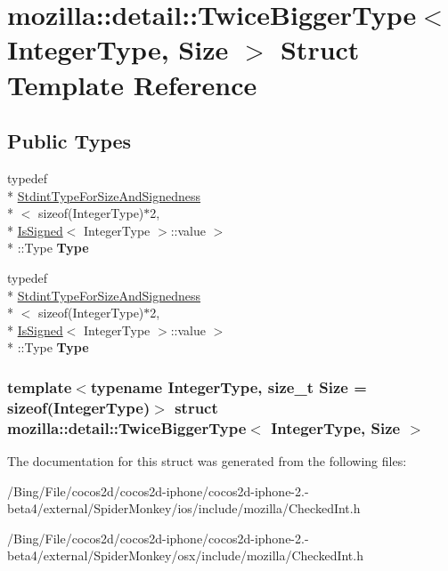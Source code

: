 \hypertarget{structmozilla_1_1detail_1_1_twice_bigger_type}{\section{mozilla\-:\-:detail\-:\-:Twice\-Bigger\-Type$<$ Integer\-Type, Size $>$ Struct Template Reference}
\label{structmozilla_1_1detail_1_1_twice_bigger_type}
}
\subsection*{Public Types}
\begin{DoxyCompactItemize}
\item 
\hypertarget{structmozilla_1_1detail_1_1_twice_bigger_type_a5aa30df3ba31124b7264067cb9953081}{typedef \\*
\hyperlink{structmozilla_1_1detail_1_1_stdint_type_for_size_and_signedness}{Stdint\-Type\-For\-Size\-And\-Signedness}\\*
$<$ sizeof(Integer\-Type)$\ast$2, \\*
\hyperlink{structmozilla_1_1detail_1_1_is_signed}{Is\-Signed}$<$ Integer\-Type $>$\-::value $>$\\*
\-::Type {\bfseries Type}}\label{structmozilla_1_1detail_1_1_twice_bigger_type_a5aa30df3ba31124b7264067cb9953081}

\item 
\hypertarget{structmozilla_1_1detail_1_1_twice_bigger_type_a5aa30df3ba31124b7264067cb9953081}{typedef \\*
\hyperlink{structmozilla_1_1detail_1_1_stdint_type_for_size_and_signedness}{Stdint\-Type\-For\-Size\-And\-Signedness}\\*
$<$ sizeof(Integer\-Type)$\ast$2, \\*
\hyperlink{structmozilla_1_1detail_1_1_is_signed}{Is\-Signed}$<$ Integer\-Type $>$\-::value $>$\\*
\-::Type {\bfseries Type}}\label{structmozilla_1_1detail_1_1_twice_bigger_type_a5aa30df3ba31124b7264067cb9953081}

\end{DoxyCompactItemize}
\subsubsection*{template$<$typename Integer\-Type, size\-\_\-t Size = sizeof(\-Integer\-Type)$>$ struct mozilla\-::detail\-::\-Twice\-Bigger\-Type$<$ Integer\-Type, Size $>$}



The documentation for this struct was generated from the following files\-:\begin{DoxyCompactItemize}
\item 
/\-Bing/\-File/cocos2d/cocos2d-\/iphone/cocos2d-\/iphone-\/2.-\/beta4/external/\-Spider\-Monkey/ios/include/mozilla/Checked\-Int.\-h\item 
/\-Bing/\-File/cocos2d/cocos2d-\/iphone/cocos2d-\/iphone-\/2.-\/beta4/external/\-Spider\-Monkey/osx/include/mozilla/Checked\-Int.\-h\end{DoxyCompactItemize}
